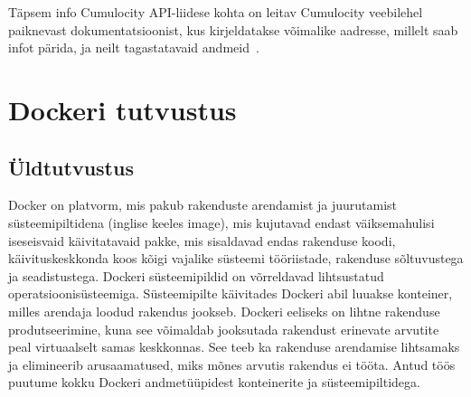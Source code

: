 \documentclass[12pt]{article}
\newcommand{\newlinespacer}{{%
    \newline
    \newline
  }}%
\begin{document}
  \FloatBarrier

  Täpsem info Cumulocity API-liidese kohta on leitav Cumulocity veebilehel paiknevast dokumentatsioonist,
  kus kirjeldatakse võimalike aadresse, millelt saab infot pärida, ja neilt tagastatavaid
  andmeid~\cite{cumulocityRestDocumentation}.




  





  
  
  
  \newpage
  \section{Dockeri tutvustus}

  \subsection{Üldtutvustus}
  Docker on platvorm, mis pakub rakenduste arendamist ja juurutamist süsteemipiltidena
  (inglise keeles image), mis kujutavad endast väiksemahulisi iseseisvaid käivitatavaid pakke,
  mis sisaldavad endas rakenduse koodi, käivituskeskkonda koos kõigi vajalike süsteemi
  tööriistade, rakenduse sõltuvustega ja seadistustega. Dockeri süsteemipildid on võrreldavad
  lihtsustatud operatsioonisüsteemiga. Süsteemipilte käivitades Dockeri abil luuakse konteiner,
  milles arendaja loodud rakendus jookseb.
  \newlinespacer
  Dockeri eeliseks on lihtne rakenduse produtseerimine, kuna see võimaldab jooksutada rakendust
  erinevate arvutite peal virtuaalselt samas keskkonnas. See teeb ka rakenduse arendamise
  lihtsamaks ja elimineerib arusaamatused, miks mõnes arvutis rakendus ei tööta.
  \newlinespacer
  Antud töös puutume kokku Dockeri andmetüüpidest konteinerite ja süsteemipiltidega.
\end{document}
